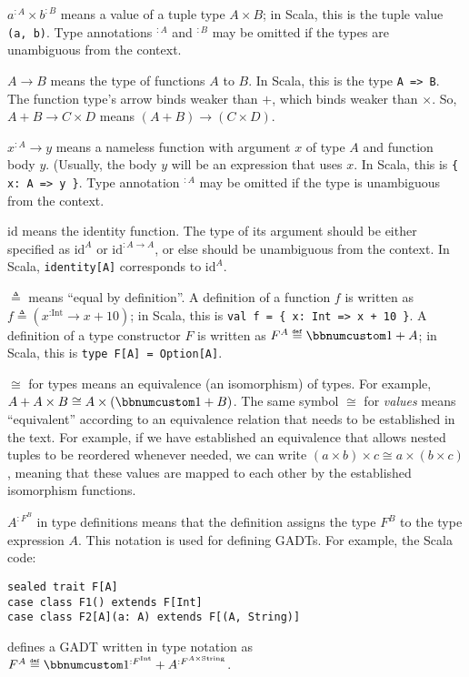 $a^{:A}\times b^{:B}$ means a value of a tuple type $A\times B$;
in Scala, this is the tuple value \lstinline!(a, b)!. Type annotations
$^{:A}$ and $^{:B}$ may be omitted if the types are unambiguous
from the context.

$A\rightarrow B$ means the type of functions $A$ to $B$. In Scala,
this is the type \lstinline!A => B!. The function type\textsf{'}s arrow binds
weaker than $+$, which binds weaker than $\times$. So, $A+B\rightarrow C\times D$
means $(A+B)\rightarrow(C\times D)$.

$x^{:A}\rightarrow y$ means a nameless function with argument $x$
of type $A$ and function body $y$. (Usually, the body $y$ will
be an expression that uses $x$. In Scala, this is \lstinline!{ x: A => y }!.
Type annotation $^{:A}$ may be omitted if the type is unambiguous
from the context.

$\text{id}$ means the identity function. The type of its argument
should be either specified as $\text{id}^{A}$ or $\text{id}^{:A\rightarrow A}$,
or else should be unambiguous from the context. In Scala,  \lstinline!identity[A]!
corresponds to $\text{id}^{A}$.

$\triangleq$ means \textsf{``}equal by definition\textsf{''}. A definition of a function
$f$ is written as $f\triangleq(x^{:\text{Int}}\rightarrow x+10)$;
in Scala, this is \lstinline!val f = { x: Int => x + 10 }!. A definition
of a type constructor $F$ is written as $F^{A}\triangleq\bbnum 1+A$;
in Scala, this is \lstinline!type F[A] = Option[A]!.

$\cong$ for types means an equivalence (an isomorphism) of types.
For example, $A+A\times B\cong A\times\left(\bbnum 1+B\right)$. The
same symbol $\cong$ for \emph{values} means \textsf{``}equivalent\textsf{''} according
to an equivalence relation that needs to be established in the text.
For example, if we have established an equivalence that allows nested
tuples to be reordered whenever needed, we can write $\left(a\times b\right)\times c\cong a\times\left(b\times c\right)$,
meaning that these values are mapped to each other by the established
isomorphism functions. 

$A^{:F^{B}}$ in type definitions means that the definition assigns
the type $F^{B}$ to the type expression $A$. This notation is used
for defining GADTs. For example, the Scala code:

\begin{lstlisting}
sealed trait F[A]
case class F1() extends F[Int]
case class F2[A](a: A) extends F[(A, String)]
\end{lstlisting}
defines a GADT written in type notation as $F^{A}\triangleq\bbnum 1^{:F^{\text{Int}}}+A^{:F^{A\times\text{String}}}$.


